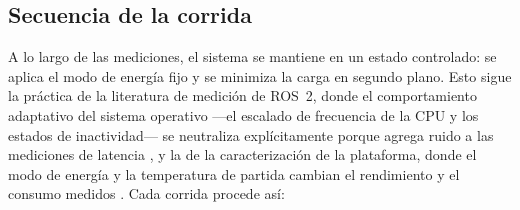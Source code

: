 \subsection{Secuencia de la corrida}
\label{sec:run-sequence}

A lo largo de las mediciones, el sistema se mantiene en un estado
controlado: se aplica el modo de energía fijo y se minimiza la carga en
segundo plano. Esto sigue la práctica de la literatura de medición de
ROS~2, donde el comportamiento adaptativo del sistema operativo ---el
escalado de frecuencia de la CPU y los estados de inactividad--- se
neutraliza explícitamente porque agrega ruido a las mediciones de latencia
\cite{kronauer2021}, y la de la caracterización de la plataforma, donde el
modo de energía y la temperatura de partida cambian el rendimiento y el
consumo medidos \cite{tang2026}. Cada corrida procede así:

